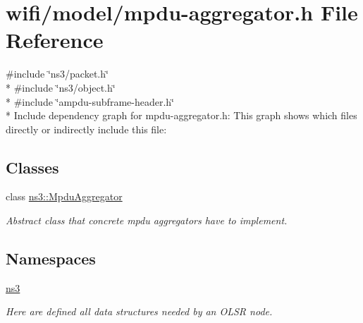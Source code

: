 \hypertarget{mpdu-aggregator_8h}{}\section{wifi/model/mpdu-\/aggregator.h File Reference}
\label{mpdu-aggregator_8h}
{\ttfamily \#include \char`\"{}ns3/packet.\+h\char`\"{}}\\*
{\ttfamily \#include \char`\"{}ns3/object.\+h\char`\"{}}\\*
{\ttfamily \#include \char`\"{}ampdu-\/subframe-\/header.\+h\char`\"{}}\\*
Include dependency graph for mpdu-\/aggregator.h\+:
This graph shows which files directly or indirectly include this file\+:
\subsection*{Classes}
\begin{DoxyCompactItemize}
\item 
class \hyperlink{classns3_1_1MpduAggregator}{ns3\+::\+Mpdu\+Aggregator}
\begin{DoxyCompactList}\small\item\em Abstract class that concrete mpdu aggregators have to implement. \end{DoxyCompactList}\end{DoxyCompactItemize}
\subsection*{Namespaces}
\begin{DoxyCompactItemize}
\item 
 \hyperlink{namespacens3}{ns3}
\begin{DoxyCompactList}\small\item\em Here are defined all data structures needed by an O\+L\+SR node. \end{DoxyCompactList}\end{DoxyCompactItemize}
